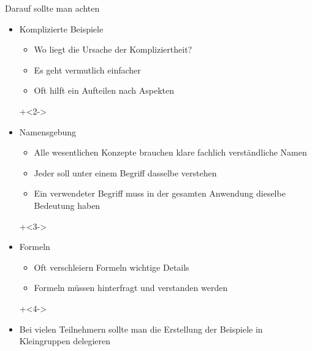 \begin{frame}{Darauf sollte man achten}

\begin{itemize}
	\item Komplizierte Beispiele
	\begin{itemize}
		\item Wo liegt die Ursache der Kompliziertheit?
		\item Es geht vermutlich einfacher
		\item Oft hilft ein Aufteilen nach Aspekten
	\end{itemize}
	
\onslide+<2->
	
	\item Namensgebung
	\begin{itemize}
		\item Alle wesentlichen Konzepte brauchen klare fachlich verständliche Namen
		\item Jeder soll unter einem Begriff dasselbe verstehen
		\item Ein verwendeter Begriff muss in der gesamten Anwendung dieselbe Bedeutung haben
	\end{itemize}
	
\onslide+<3->
	
	\item Formeln
	\begin{itemize}
		\item Oft verschleiern Formeln wichtige Details
		\item Formeln müssen hinterfragt und verstanden werden
	\end{itemize}
	
\onslide+<4->
	
	\item Bei vielen Teilnehmern sollte man die Erstellung der Beispiele in Kleingruppen delegieren
\end{itemize}

\end{frame}



